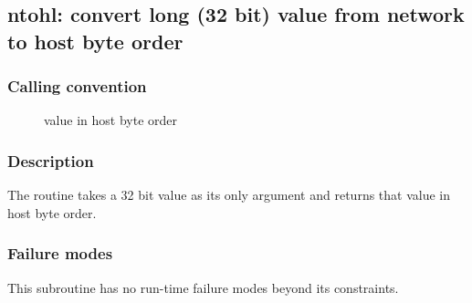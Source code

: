 \clearpage
{}
{}
\label{subr:ntohl}
\subsection*{ntohl: convert long (32 bit) value from network to host
  byte order}

\subsubsection*{Calling convention}

\begin{description}
\item[] value in host byte order
\end{description}

\subsubsection*{Description}

The  routine takes a 32 bit value as its only
argument and returns that value in host byte order.

\subsubsection*{Failure modes}

This subroutine has no run-time failure modes beyond its constraints.
